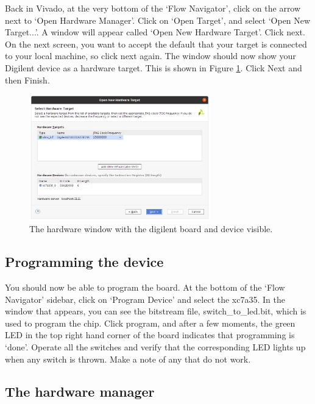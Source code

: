 \documentclass[../physical_computing.tex]{subfiles}
\begin{document}
Back in Vivado, at the very bottom of the `Flow Navigator', click on the arrow next to `Open Hardware Manager'. Click on `Open Target', and select `Open New Target...'. A window will appear called `Open New Hardware Target'. Click next. On the next screen, you want to accept the default that your target is connected to your local machine, so click next again. The window should now show your Digilent device as a hardware target. This is shown in Figure \ref{fig:hardware_target}. Click Next and then Finish.

\begin{figure}[htbp]
    \centering
    \includegraphics[width=0.7\textwidth]{figures/hardware_target.png}
    \caption{The hardware window with the digilent board and device visible.}
    \label{fig:hardware_target}
\end{figure}

\subsection{Programming the device}
\label{sec:programming}

You should now be able to program the board. At the bottom of the `Flow Navigator' sidebar, click on `Program Device' and select the xc7a35. In the window that appears, you can see the bitstream file, switch\_to\_led.bit, which is used to program the chip. Click program, and after a few moments, the green LED in the top right hand corner of the board indicates that programming is `done'. Operate all the switches and verify that the corresponding LED lights up when any switch is thrown. Make a note of any that do not work.

\subsection{The hardware manager}
\label{sec:hardware_manager}
\end{document}
